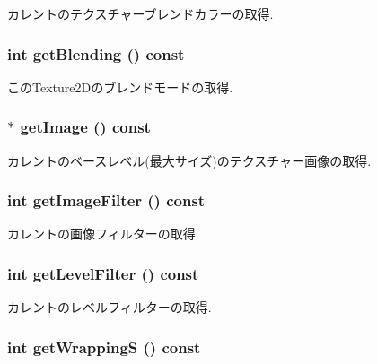 カレントのテクスチャーブレンドカラーの取得. \hypertarget{classm3g_1_1Texture2D_078954de3d786bd11dc98b06f237bbbb}{
\subsubsection[{getBlending}]{\setlength{\rightskip}{0pt plus 5cm}int getBlending () const}}
\label{classm3g_1_1Texture2D_078954de3d786bd11dc98b06f237bbbb}


このTexture2Dのブレンドモードの取得. \hypertarget{classm3g_1_1Texture2D_a8c0193b0e7d47d4b5c9f60df24c44f5}{
\subsubsection[{getImage}]{ $\ast$ getImage () const}}
\label{classm3g_1_1Texture2D_a8c0193b0e7d47d4b5c9f60df24c44f5}


カレントのベースレベル(最大サイズ)のテクスチャー画像の取得. \hypertarget{classm3g_1_1Texture2D_7b1e1ea0acc3d2096d346afdecc2ea5f}{
\subsubsection[{getImageFilter}]{\setlength{\rightskip}{0pt plus 5cm}int getImageFilter () const}}
\label{classm3g_1_1Texture2D_7b1e1ea0acc3d2096d346afdecc2ea5f}


カレントの画像フィルターの取得. \hypertarget{classm3g_1_1Texture2D_039f7813e846bedec1aaf4c413c15924}{
\subsubsection[{getLevelFilter}]{\setlength{\rightskip}{0pt plus 5cm}int getLevelFilter () const}}
\label{classm3g_1_1Texture2D_039f7813e846bedec1aaf4c413c15924}


カレントのレベルフィルターの取得. \hypertarget{classm3g_1_1Texture2D_6bdb583791178dc5002f4d0ae88293a9}{
\subsubsection[{getWrappingS}]{\setlength{\rightskip}{0pt plus 5cm}int getWrappingS () const}}
\label{classm3g_1_1Texture2D_6bdb583791178dc5002f4d0ae88293a9}


